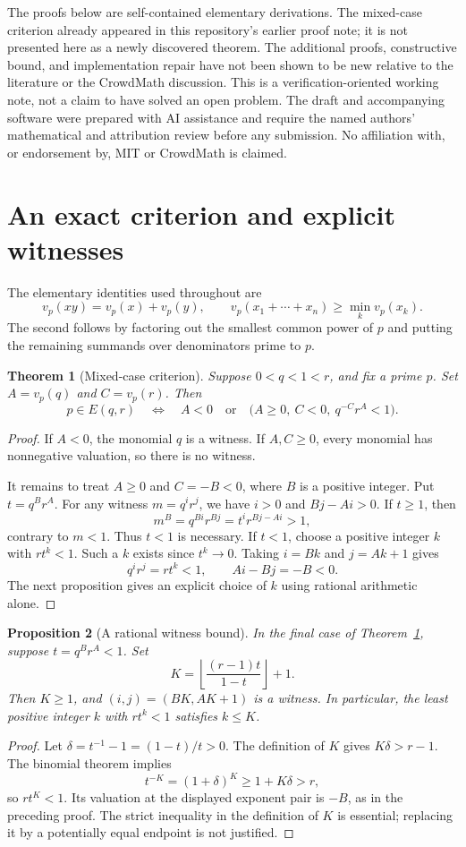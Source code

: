 \documentclass[11pt]{article}
\newtheorem{theorem}{Theorem}[section]
\newtheorem{proposition}[theorem]{Proposition}
\theoremstyle{definition}
\begin{document}
The proofs below are self-contained elementary derivations. The mixed-case
criterion already appeared in this repository's earlier proof note; it is
not presented here as a newly discovered theorem. The additional proofs,
constructive bound, and implementation repair have not been shown to be new
relative to the literature or the CrowdMath discussion. This is a
verification-oriented working note, not a claim to have solved an open problem.
The draft and accompanying software were prepared with AI assistance and
require the named authors' mathematical and attribution review before any
submission. No affiliation with, or endorsement by, MIT or CrowdMath is claimed.

\section{An exact criterion and explicit witnesses}
The elementary identities used throughout are
\[
 v_p(xy)=v_p(x)+v_p(y),\qquad
 v_p(x_1+\cdots+x_n)\ge\min_k v_p(x_k).
\]
The second follows by factoring out the smallest common power of $p$ and
putting the remaining summands over denominators prime to $p$.

\begin{theorem}[Mixed-case criterion]\label{thm:mixed}
Suppose $0<q<1<r$, and fix a prime $p$. Set $A=v_p(q)$ and $C=v_p(r)$.
Then
\[
 p\in E(q,r)\quad\Longleftrightarrow\quad
 A<0\quad\text{or}\quad
 \bigl(A\ge0,\ C<0,\ q^{-C}r^A<1\bigr).
\]
\end{theorem}
\begin{proof}
If $A<0$, the monomial $q$ is a witness. If $A,C\ge0$, every monomial has
nonnegative valuation, so there is no witness.

It remains to treat $A\ge0$ and $C=-B<0$, where $B$ is a positive integer.
Put $t=q^Br^A$. For any witness $m=q^ir^j$, we have $i>0$ and $Bj-Ai>0$.
If $t\ge1$, then
\[
 m^B=q^{Bi}r^{Bj}=t^i r^{Bj-Ai}>1,
\]
contrary to $m<1$. Thus $t<1$ is necessary. If $t<1$, choose a positive
integer $k$ with $rt^k<1$. Such a $k$ exists since $t^k\to0$.
Taking $i=Bk$ and $j=Ak+1$ gives
\[
 q^ir^j=rt^k<1,\qquad Ai-Bj=-B<0.
\]
The next proposition gives an explicit choice of $k$ using rational
arithmetic alone.
\end{proof}

\begin{proposition}[A rational witness bound]\label{prop:bound}
In the final case of Theorem~\ref{thm:mixed}, suppose $t=q^Br^A<1$. Set
\[
 K=\left\lfloor\frac{(r-1)t}{1-t}\right\rfloor+1.
\]
Then $K\ge1$, and $(i,j)=(BK,AK+1)$ is a witness. In particular, the least
positive integer $k$ with $rt^k<1$ satisfies $k\le K$.
\end{proposition}
\begin{proof}
Let $\delta=t^{-1}-1=(1-t)/t>0$. The definition of $K$ gives
$K\delta>r-1$. The binomial theorem implies
\[
 t^{-K}=(1+\delta)^K\ge1+K\delta>r,
\]
so $rt^K<1$. Its valuation at the displayed exponent pair is $-B$, as in
the preceding proof. The strict inequality in the definition of $K$ is
essential; replacing it by a potentially equal endpoint is not justified.
\end{proof}
\end{document}
